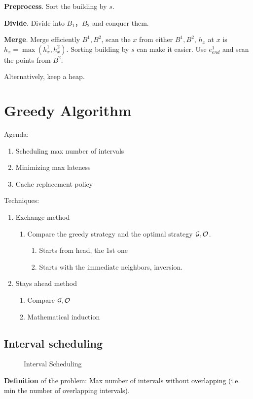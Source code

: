 \documentclass[a4paper]{report}
\theoremstyle{definition}
\begin{document}
\textbf{Preprocess}. Sort the building by $s$.

\textbf{Divide}. Divide into $B_1， B_2$ and conquer them.

\textbf{Merge}. Merge efficiently $B^1, B^2$, scan the $x$ from either $B^1, B^2$, $h_x$ at $x$ is $h_x=\max(h^1_x,h_x^2)$. Sorting building by $s$ can make it easier. Use $e^1_{end}$ and scan the points from $B^2$.

Alternatively, keep a heap. 

\chapter{Greedy Algorithm}
Agenda:
\begin{enumerate}
\item Scheduling max number of intervals
\item Minimizing max lateness
\item Cache replacement policy
\end{enumerate}
Techniques:
\begin{enumerate}
\item Exchange method
\begin{enumerate}
\item Compare the greedy strategy and the optimal strategy $\mathcal{G}, \mathcal{O}$.
\begin{enumerate}
\item Starts from head, the 1st one
\item Starts with the immediate neighbors, inversion.
\end{enumerate}
\end{enumerate}
\item Stays ahead method
\begin{enumerate}
\item Compare $\mathcal{G}, \mathcal{O}$
\item Mathematical induction
\end{enumerate}
\end{enumerate}
\section{Interval scheduling}
\begin{figure}[!htp]
\centering
{}
\caption{Interval Scheduling}
\label{fig:4_2}
\end{figure}
\textbf{Definition} of the problem: Max number of intervals without overlapping (i.e. min the number of overlapping intervals).
\end{document}
